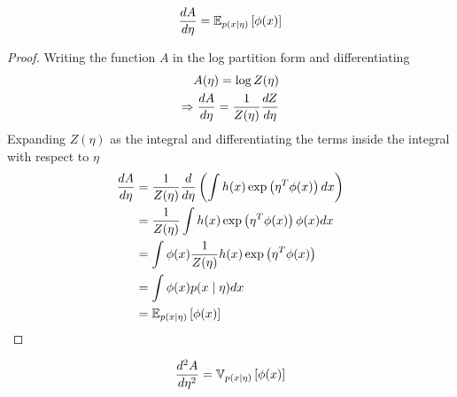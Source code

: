 \documentclass{homework}
\begin{document}
\subsection{}
$${d A \over d \eta} = \mathbb{E}_{p(x\mid \eta)}\left[\phi(x)\right]$$
\renewcommand\qedsymbol{$\square$}
\begin{proof}
Writing the function $A$ in the log partition form and differentiating
\begin{align*}
    A(\eta) = \log Z(\eta)\\
    \Rightarrow{d A \over d\eta} = {1\over Z(\eta)} {d Z \over d \eta}\\ 
\end{align*}
Expanding $Z(\eta)$ as the integral and differentiating the terms inside the integral with respect to $\eta$
\begin{align*}
    {d A \over d\eta} &= {1\over Z(\eta)} {d \over d \eta} \left(\int h(x) \exp\left(\eta^T \phi (x)\right) dx\right)\\ 
    &= {1\over Z(\eta)} \int h(x) \exp\left(\eta^T \phi (x)\right) \phi(x) dx\\
    &= {\int \phi(x) {{1\over Z(\eta)}h(x) \exp\left(\eta^T \phi (x)\right)}}\\
    &= \int \phi(x) p(x\mid \eta) dx\\
    &= \mathbb{E}_{p(x\mid \eta)}\left[\phi(x) \right]
\end{align*}
\end{proof}
$${d^2 A \over d \eta^2} = \mathbb{V}_{p(x\mid \eta)}\left[\phi(x)\right]$$
\renewcommand\qedsymbol{$\square$}
\end{document}

